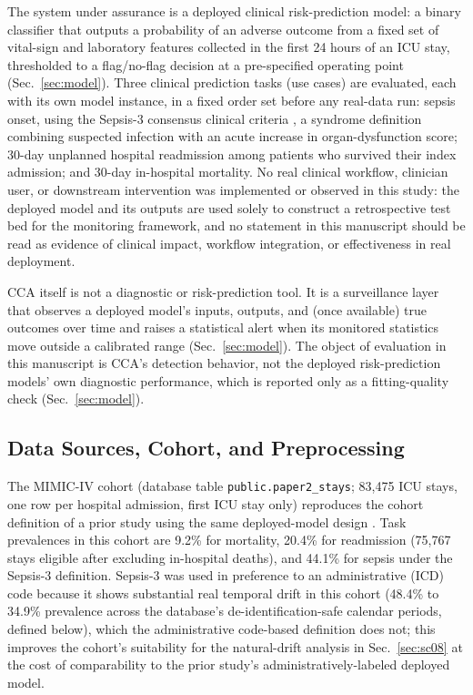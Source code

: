 \documentclass[preprintsapa,article,submit,oneauthor]{Definitions/mdpi}
\begin{document}
The system under assurance is a deployed clinical risk-prediction model: a binary classifier that outputs a probability of an adverse outcome from a fixed set of vital-sign and laboratory features collected in the first 24 hours of an ICU stay, thresholded to a flag/no-flag decision at a pre-specified operating point (Sec.~\ref{sec:model}). Three clinical prediction tasks (use cases) are evaluated, each with its own model instance, in a fixed order set before any real-data run: sepsis onset, using the Sepsis-3 consensus clinical criteria \citep{singer2016}, a syndrome definition combining suspected infection with an acute increase in organ-dysfunction score; 30-day unplanned hospital readmission among patients who survived their index admission; and 30-day in-hospital mortality. No real clinical workflow, clinician user, or downstream intervention was implemented or observed in this study: the deployed model and its outputs are used solely to construct a retrospective test bed for the monitoring framework, and no statement in this manuscript should be read as evidence of clinical impact, workflow integration, or effectiveness in real deployment.

CCA itself is not a diagnostic or risk-prediction tool. It is a surveillance layer that observes a deployed model's inputs, outputs, and (once available) true outcomes over time and raises a statistical alert when its monitored statistics move outside a calibrated range (Sec.~\ref{sec:model}). The object of evaluation in this manuscript is CCA's detection behavior, not the deployed risk-prediction models' own diagnostic performance, which is reported only as a fitting-quality check (Sec.~\ref{sec:model}).

\subsection{Data Sources, Cohort, and Preprocessing}\label{sec:cohort}

The MIMIC-IV cohort (database table \texttt{public.paper2\_stays}; 83{,}475 ICU stays, one row per hospital admission, first ICU stay only) reproduces the cohort definition of a prior study using the same deployed-model design \citep{yu2026deferral}. Task prevalences in this cohort are 9.2\% for mortality, 20.4\% for readmission (75{,}767 stays eligible after excluding in-hospital deaths), and 44.1\% for sepsis under the Sepsis-3 definition. Sepsis-3 was used in preference to an administrative (ICD) code because it shows substantial real temporal drift in this cohort (48.4\% to 34.9\% prevalence across the database's de-identification-safe calendar periods, defined below), which the administrative code-based definition does not; this improves the cohort's suitability for the natural-drift analysis in Sec.~\ref{sec:sc08} at the cost of comparability to the prior study's administratively-labeled deployed model.
\end{document}
